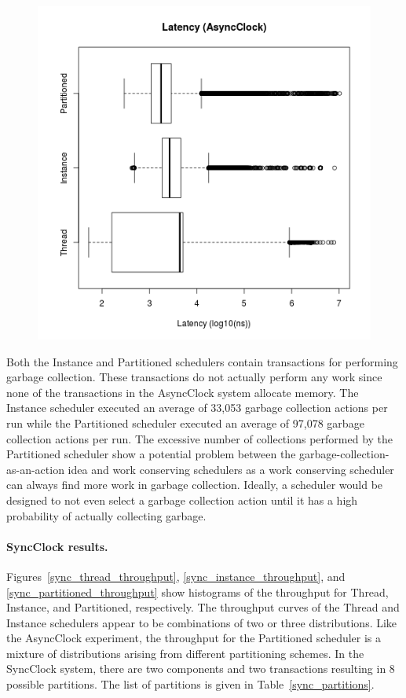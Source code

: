 \begin{figure}
\center
\includegraphics[height=.4\textheight]{async_latency_box.png}
\caption{\label{async_latency_box}}
\end{figure}

Both the Instance and Partitioned schedulers contain transactions for performing garbage collection.
These transactions do not actually perform any work since none of the transactions in the AsyncClock system allocate memory.
The Instance scheduler executed an average of 33,053 garbage collection actions per run while the Partitioned scheduler executed an average of 97,078 garbage collection actions per run.
The excessive number of collections performed by the Partitioned scheduler show a potential problem between the garbage-collection-as-an-action idea and work conserving schedulers as a work conserving scheduler can always find more work in garbage collection.
Ideally, a scheduler would be designed to not even select a garbage collection action until it has a high probability of actually collecting garbage.

\clearpage

\paragraph{SyncClock results.}
Figures~\ref{sync_thread_throughput}, \ref{sync_instance_throughput}, and \ref{sync_partitioned_throughput} show histograms of the throughput for Thread, Instance, and Partitioned, respectively.
The throughput curves of the Thread and Instance schedulers appear to be combinations of two or three distributions.
Like the AsyncClock experiment, the throughput for the Partitioned scheduler is a mixture of distributions arising from different partitioning schemes.
In the SyncClock system, there are two components and two transactions resulting in 8 possible partitions.
The list of partitions is given in Table~\ref{sync_partitions}.

